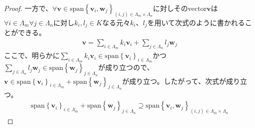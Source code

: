 \documentclass[dvipdfmx]{jsarticle}
\begin{document}
\begin{proof}
一方で、$\forall\mathbf{v} \in {\mathrm{span}}\left\{ \mathbf{v}_{i},\mathbf{w}_{j} \right\}_{(i,j) \in \varLambda_{m} \times \varLambda_{n}}$に対しそのvector$\mathbf{v}$は$\forall i \in \varLambda_{m}\forall j \in \varLambda_{n}$に対し$k_{i},l_{j} \in K$なる元々$k_{i}$、$l_{j}$を用いて次式のように書かれることができる。
\begin{align*}
\mathbf{v} = \sum_{i \in \varLambda_{m}} {k_{i}\mathbf{v}_{i}} + \sum_{j \in \varLambda_{n}} {l_{j}\mathbf{w}_{j}}
\end{align*}
ここで、明らかに$\sum_{i \in \varLambda_{m}} {k_{i}\mathbf{v}_{i}} \in {\mathrm{span}}\left\{ \mathbf{v}_{i} \right\}_{i \in \varLambda_{m}}$かつ$\sum_{j \in \varLambda_{n}} {l_{j}\mathbf{w}_{j}} \in {\mathrm{span}}\left\{ \mathbf{w}_{j} \right\}_{j \in \varLambda_{n}}$が成り立つので、$\mathbf{v} \in {\mathrm{span}}\left\{ \mathbf{v}_{i} \right\}_{i \in \varLambda_{m}} + {\mathrm{span}}\left\{ \mathbf{w}_{j} \right\}_{j \in \varLambda_{n}}$が成り立つ。したがって、次式が成り立つ。
\begin{align*}
{\mathrm{span}}\left\{ \mathbf{v}_{i} \right\}_{i \in \varLambda_{m}} + {\mathrm{span}}\left\{ \mathbf{w}_{j} \right\}_{j \in \varLambda_{n}} \supseteq {\mathrm{span}}\left\{ \mathbf{v}_{i},\mathbf{w}_{j} \right\}_{(i,j) \in \varLambda_{m} \times \varLambda_{n}}
\end{align*}
\end{proof}
\end{document}
